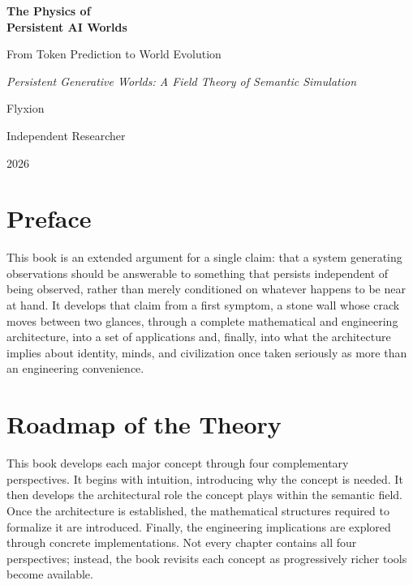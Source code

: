 \documentclass[11pt,oneside]{book}
\newcommand{\booksubtitle}{From Token Prediction to World Evolution}
\newcommand{\bookalttitle}{Persistent Generative Worlds: A Field Theory of Semantic Simulation}
\begin{document}
\begin{titlepage}
\centering
\vspace*{3cm}
{\Huge\bfseries The Physics of\\[4pt] Persistent AI Worlds\par}
\vspace{1cm}
{\Large \booksubtitle \par}
\vspace{0.6cm}
{\normalsize\itshape \bookalttitle \par}
\vfill
{\Large Flyxion\par}
\vspace{0.3cm}
{\normalsize Independent Researcher\par}
\vspace{1.5cm}
{\normalsize 2026\par}
\vspace*{2cm}
\end{titlepage}

\frontmatter

\chapter*{Preface}
This book is an extended argument for a single claim: that a system generating
observations should be answerable to something that persists independent of
being observed, rather than merely conditioned on whatever happens to be
near at hand. It develops that claim from a first symptom, a stone wall
whose crack moves between two glances, through a complete mathematical and
engineering architecture, into a set of applications and, finally, into
what the architecture implies about identity, minds, and civilization once
taken seriously as more than an engineering convenience.

\chapter*{Roadmap of the Theory}
This book develops each major concept through four complementary
perspectives. It begins with intuition, introducing why the concept is
needed. It then develops the architectural role the concept plays within
the semantic field. Once the architecture is established, the mathematical
structures required to formalize it are introduced. Finally, the
engineering implications are explored through concrete implementations.
Not every chapter contains all four perspectives; instead, the book
revisits each concept as progressively richer tools become available.
\end{document}
